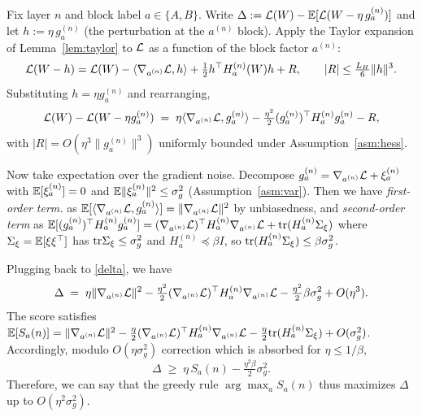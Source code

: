 Fix layer $n$ and block label $a\in\{A,B\}$. Write $\Delta:=\mathcal{L}(W)-\mathbb{E}[\mathcal{L}(W-\eta\,g_a^{(n)})]$ and let $h:=\eta\,g_a^{(n)}$ (the perturbation at the $a^{(n)}$ block). Apply the Taylor expansion of Lemma~\ref{lem:taylor} to $\mathcal{L}$ as a function of the block factor $a^{(n)}$:
\begin{equation}
\mathcal{L}(W-h)=\mathcal{L}(W)-\langle\nabla_{a^{(n)}}\mathcal{L},h\rangle+\tfrac12 h^\top H_a^{(n)}(W) h+R, \qquad |R|\le\tfrac{L_H}{6}\|h\|^3.
\end{equation}
Substituting $h=\eta g_a^{(n)}$ and rearranging,
\begin{equation} \label{delta}
\mathcal{L}(W)-\mathcal{L}(W-\eta g_a^{(n)}) \;=\; \eta\langle\nabla_{a^{(n)}}\mathcal{L},g_a^{(n)}\rangle - \tfrac{\eta^2}{2}(g_a^{(n)})^\top H_a^{(n)} g_a^{(n)} - R,
\end{equation}
with $|R|=O(\eta^3\|g_a^{(n)}\|^3)$ uniformly bounded under Assumption~\ref{asm:hess}.

Now take expectation over the gradient noise. Decompose $g_a^{(n)}=\nabla_{a^{(n)}}\mathcal{L}+\xi_a^{(n)}$ with $\mathbb{E}[\xi_a^{(n)}]=0$ and $\mathbb{E}\|\xi_a^{(n)}\|^2\le\sigma_g^2$ (Assumption~\ref{asm:var}). Then we have
\emph{first-order term.} as $\mathbb{E}[\langle\nabla_{a^{(n)}}\mathcal{L},g_a^{(n)}\rangle] = \|\nabla_{a^{(n)}}\mathcal{L}\|^2$ by unbiasedness, and \emph{second-order term} as $\mathbb{E}[(g_a^{(n)})^\top H_a^{(n)} g_a^{(n)}] = (\nabla_{a^{(n)}}\mathcal{L})^\top H_a^{(n)}\nabla_{a^{(n)}}\mathcal{L} + \mathrm{tr}(H_a^{(n)}\Sigma_\xi)$ where $\Sigma_\xi=\mathbb{E}[\xi\xi^\top]$ has $\mathrm{tr}\Sigma_\xi\le\sigma_g^2$ and $H_a^{(n)}\preceq\beta I$, so $\mathrm{tr}(H_a^{(n)}\Sigma_\xi)\le\beta\sigma_g^2$.

Plugging back to \eqref{delta}, we have 
\begin{equation}
\Delta \;=\; \eta\|\nabla_{a^{(n)}}\mathcal{L}\|^2 - \tfrac{\eta^2}{2}(\nabla_{a^{(n)}}\mathcal{L})^\top H_a^{(n)}\nabla_{a^{(n)}}\mathcal{L} - \tfrac{\eta^2}{2}\beta\sigma_g^2 + O(\eta^3).
\end{equation}
The score satisfies $\mathbb{E}[S_a (n)]=\|\nabla_{a^{(n)}}\mathcal{L}\|^2-\tfrac{\eta}{2}(\nabla_{a^{(n)}}\mathcal{L})^\top H_a^{(n)}\nabla_{a^{(n)}}\mathcal{L}-\tfrac{\eta}{2}\mathrm{tr}(H_a^{(n)}\Sigma_\xi)+ O(\sigma_g^2)$. Accordingly, modulo $O(\eta\sigma_g^2)$ correction which is absorbed for $\eta\le 1/\beta$,
\begin{equation}\label{eq:per-round-proved}
\Delta \;\ge\; \eta\,S_a (n) - \tfrac{\eta^2\beta}{2}\sigma_g^2.
\end{equation}
Therefore, we can say that the greedy rule $\arg\max_a S_a (n)$ thus maximizes $\Delta$ up to $O(\eta^2\sigma_g^2)$.


